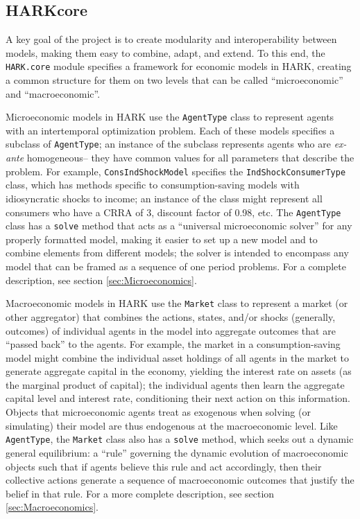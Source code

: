\documentclass[12pt,titlepage,letterpaper]{econtex}
\begin{document}
{\subsection{HARKcore}\label{sec:HARKcore}

A key goal of the project is to create modularity and interoperability between models, making them easy to combine, adapt, and extend.  To this end, the \texttt{HARK.core} module specifies a framework for economic models in HARK, creating a common structure for them on two levels that can be called ``microeconomic'' and ``macroeconomic''.

Microeconomic models in HARK use the \texttt{AgentType} class to represent agents with an intertemporal optimization problem.  Each of these models specifies a subclass of \texttt{AgentType}; an instance of the subclass represents agents who are \textit{ex-ante} homogeneous-- they have common values for all parameters that describe the problem.  For example, \texttt{ConsIndShockModel} specifies the \texttt{IndShockConsumerType} class, which has methods specific to consumption-saving models with idiosyncratic shocks to income; an instance of the class might represent all consumers who have a CRRA of 3, discount factor of 0.98, etc.  The \texttt{AgentType} class has a \texttt{solve} method that acts as a ``universal microeconomic solver'' for any properly formatted model, making it easier to set up a new model and to combine elements from different models; the solver is intended to encompass any model that can be framed as a sequence of one period problems.  For a complete description, see section \ref{sec:Microeconomics}.

Macroeconomic models in HARK use the \texttt{Market} class to represent a market (or other aggregator) that combines the actions, states, and/or shocks (generally, outcomes) of individual agents in the model into aggregate outcomes that are ``passed back'' to the agents.  For example, the market in a consumption-saving model might combine the individual asset holdings of all agents in the market to generate aggregate capital in the economy, yielding the interest rate on assets (as the marginal product of capital); the individual agents then learn the aggregate capital level and interest rate, conditioning their next action on this information.  Objects that microeconomic agents treat as exogenous when solving (or simulating) their model are thus endogenous at the macroeconomic level. Like \texttt{AgentType}, the \texttt{Market} class also has a \texttt{solve} method, which seeks out a dynamic general equilibrium: a ``rule'' governing the dynamic evolution of macroeconomic objects such that if agents believe this rule and act accordingly, then their collective actions generate a sequence of macroeconomic outcomes that justify the belief in that rule.  For a more complete description, see section \ref{sec:Macroeconomics}.

}
\end{document}
